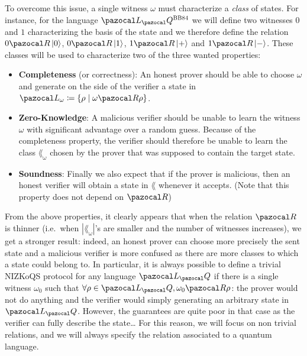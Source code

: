 To overcome this issue, a single witness $\omega$ must characterize a \emph{class} of states. For instance, for the language $\lang_\cQ^{\BBHeightyFor{}}$ we will define two witnesses $0$ and $1$ characterizing the basis of the state and we therefore define the relation $0 \cR \ket{0}$, $0 \cR \ket{1}$, $1 \cR \ket{+}$ and $1 \cR \ket{-}$. These classes will be used to characterize two of the three wanted properties:
\begin{itemize}
\item \textbf{Completeness} (or correctness): An honest prover should be able to choose $\omega$ and generate on the side of the verifier a state in $\lang_\omega \eqdef \{\rho \mid \omega \cR \rho\}$.
\item \textbf{Zero-Knowledge}: A malicious verifier should be unable to learn the witness $\omega$ with significant advantage over a random guess. Because of the completeness property, the verifier should therefore be unable to learn the class $\lang_\omega$ chosen by the prover that was supposed to contain the target state.
\item \textbf{Soundness}: Finally we also expect that if the prover is malicious, then an honest verifier will obtain a state in $\lang$ whenever it accepts. (Note that this property does not depend on $\cR$)
\end{itemize}

From the above properties, it clearly appears that when the relation $\cR$ is thinner (i.e.\ when $|\lang_\omega|$'s are smaller and the number of witnesses increases), we get a stronger result: indeed, an honest prover can choose more precisely the sent state and a malicious verifier is more confused as there are more classes to which a state could belong to. In particular, it is always possible to define a trivial NIZKoQS protocol for any language $\lang_\cQ$ if there is a single witness $\omega_0$ such that $\forall \rho \in \lang_\cQ, \omega_0 \cR \rho$: the prover would not do anything and the verifier would simply generating an arbitrary state in $\lang_\cQ$. However, the guarantees are quite poor in that case as the verifier can fully describe the state\dots{} For this reason, we will focus on non trivial relations, and we will always specify the relation associated to a quantum language.

